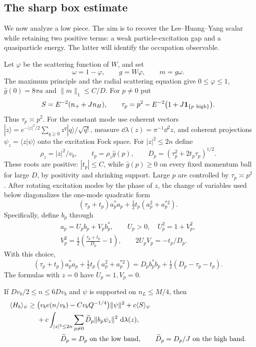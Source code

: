 \subsection{The sharp box estimate}

We now analyze a low piece.  The aim is to recover the
Lee--Huang--Yang scalar while retaining two positive terms: a weak
particle-excitation gap and a quasiparticle energy.  The latter will
identify the occupation observable.

Let $\varphi$ be the scattering function of $W$, and set
\[
 \omega=1-\varphi,\qquad g=W\varphi,\qquad m=g\omega.
\]
The maximum principle and the radial scattering equation give
$0\le\varphi\le1$, $\widehat g(0)=8\pi a$ and $\|m\|_1\le C/D$.
For $p\ne0$ put
\begin{equation}\label{eq:energy-tau}
 S=E^{-2}(n_++Jn_H),\qquad
 \tau_p=p^2-E^{-2}\bigl(1+J\mathbf 1_{\{p\ \text{high}\}}\bigr).
\end{equation}
Thus $\tau_p\asymp p^2$.  For the constant mode use coherent vectors
$|z\rangle=e^{-|z|^2/2}\sum_{q\ge0}z^q|q\rangle/\sqrt{q!}$,
measure $\dd\lambda(z)=\pi^{-1}\dd^2z$, and coherent projections
$\psi_z=\langle z|\psi\rangle$ onto the excitation Fock space.
For $|z|^2\le2n$ define
\[
 \rho_z=|z|^2/v_b,\qquad t_p=\rho_z\widehat g(p),\qquad
 D_p=(\tau_p^2+2t_p\tau_p)^{1/2}.
\]
These roots are positive: $|t_p|\le C$, while $\widehat g(p)\ge0$ on
every fixed momentum ball for large $D$, by positivity and shrinking
support.  Large $p$ are controlled by $\tau_p\asymp p^2$.
After rotating excitation modes by the phase of $z$, the change of
variables used below diagonalizes the one-mode quadratic form
\[
 (\tau_p+t_p)a_p^*a_p+\tfrac12t_p(a_p^2+a_p^{*2}).
\]
Specifically, define $b_p$ through
\begin{equation}\label{eq:energy-bogoliubov}
\begin{gathered}
 a_p=U_pb_p+V_pb_p^*,\qquad U_p>0,\quad U_p^2=1+V_p^2,\\
 V_p^2=\tfrac12\left(\frac{\tau_p+t_p}{D_p}-1\right),\qquad
 2U_pV_p=-t_p/D_p.
\end{gathered}
\end{equation}
With this choice,
\[
 (\tau_p+t_p)a_p^*a_p+\tfrac12t_p(a_p^2+a_p^{*2})
  =D_pb_p^*b_p+\tfrac12(D_p-\tau_p-t_p).
\]
The formulas with $z=0$ have $U_p=1,V_p=0$.

\begin{lemma}\label{lem:energy-sharp}
If $Dv_b/2\le n\le6Dv_b$ and $\psi$ is supported on $n_L\le M/4$,
then
\begin{equation}\label{eq:sharp-energy}
\begin{split}
 \langle H_b\rangle_\psi\ge{}&
 \bigl(v_be(n/v_b)-Cv_bQ^{-1/4}\bigr)\|\psi\|^2+c\langle S\rangle_\psi\\
 &+c\int_{|z|^2\le2n}\sum_{p\ne0}\widetilde D_p
                       \|b_p\psi_z\|^2\,\dd\lambda(z),\\
 &\hspace{12mm}\widetilde D_p=D_p\ \text{on the low band},\qquad
 \widetilde D_p=D_p/J\ \text{on the high band}.
\end{split}
\end{equation}
\end{lemma}

